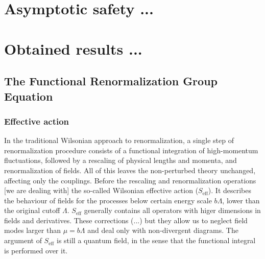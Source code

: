 \documentclass[11pt, a4paper]{article}
\begin{document}

\section{Asymptotic safety ...}




\section{Obtained results ...}


\subsection{The Functional Renormalization Group Equation}

\subsubsection*{\centering Effective action}

In the traditional Wilsonian approach to renormalization, a single step of renormalization procedure consists of
a functional integration of high-momentum fluctuations, followed by a rescaling of physical lengths and momenta, and
renormalization of fields. All of this leaves the non-perturbed theory unchanged, affecting only the couplings.
Before the rescaling and renormalization operations [we are dealing with] the so-called Wilsonian effective action ($S_{\text{eff}}$).
It describes the behaviour of fields for the processes below certain energy scale $b\Lambda$, lower than the original cutoff $\Lambda$.
$S_{\text{eff}}$ generally contains all operators with higer dimensions in fields and derivatives.
These corrections (...) but they allow us to neglect field modes larger than $\mu = b\Lambda$ and deal only with non-divergent diagrams.
The argument of $S_{\text{eff}}$ is still a quantum field, in the sense that the functional integral is performed over it. %
\end{document}
